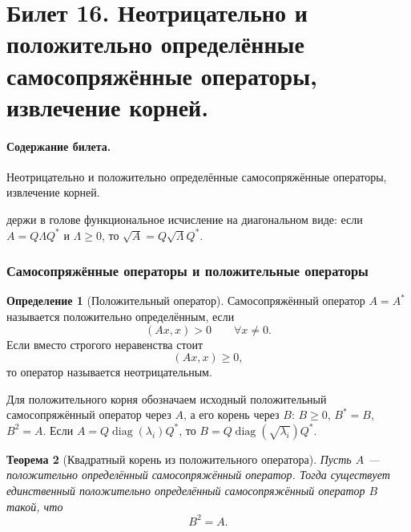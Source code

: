 \documentclass[12pt,a4paper]{article}
\theoremstyle{definition}
\newtheorem{definition}{Определение}[section]
\theoremstyle{plain}
\newtheorem{theorem}[definition]{Теорема}
\theoremstyle{remark}
\newenvironment{planadd}{\begin{planbox}}{\end{planbox}}
\newenvironment{knowledgefix}{\begin{clarifybox}}{\end{clarifybox}}
\newcommand{\diag}{\operatorname{diag}}
\begin{document}
\clearpage

\section{Билет 16. Неотрицательно и положительно определённые самосопряжённые операторы, извлечение корней.}

\paragraph{Содержание билета.} Неотрицательно и положительно определённые самосопряжённые операторы, извлечение корней.

\begin{planadd}

держи в голове функциональное исчисление на диагональном виде: если $A=Q\Lambda Q^*$ и $\Lambda\ge0$, то $\sqrt A=Q\sqrt\Lambda Q^*$.

\end{planadd}

\subsubsection{Самосопряжённые операторы и положительные операторы}


\begin{definition}[Положительный оператор]
Самосопряжённый оператор $A=A^*$ называется положительно определённым, если
\[
    (Ax,x)>0
    \qquad \forall x\ne0.
\]
Если вместо строгого неравенства стоит
\[
    (Ax,x)\ge0,
\]
то оператор называется неотрицательным.
\begin{knowledgefix}
Для положительного корня обозначаем исходный положительный самосопряжённый оператор через \(A\), а его корень через \(B\): \(B\ge0\), \(B^*=B\), \(B^2=A\). Если \(A=Q\diag(\lambda_i)Q^*\), то \(B=Q\diag(\sqrt{\lambda_i})Q^*\).
\end{knowledgefix}
\end{definition}

\begin{theorem}[Квадратный корень из положительного оператора]
Пусть $A$ --- положительно определённый самосопряжённый оператор.
Тогда существует единственный положительно определённый самосопряжённый оператор $B$ такой, что
\[
    B^2=A.
\]
\end{theorem}
\end{document}

